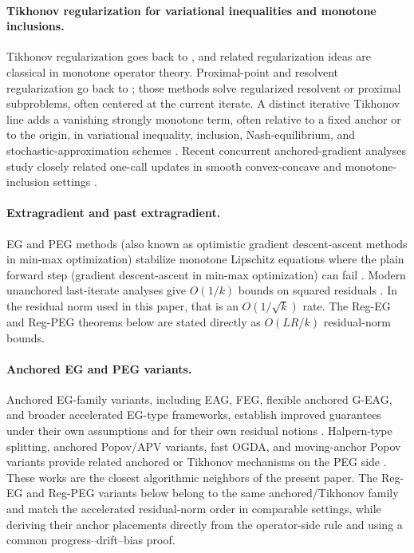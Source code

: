 \documentclass[letterpaper,11pt]{article}
\begin{document}
\paragraph{Tikhonov regularization for variational inequalities and monotone inclusions.}
Tikhonov regularization goes back to \cite{Tikhonov1943}, and related
regularization ideas are classical in monotone operator theory. Proximal-point
and resolvent regularization go back to
\cite{martinet1970regularisation,rockafellar1976monotone}; those methods solve
regularized resolvent or proximal subproblems, often centered at the current
iterate. A distinct iterative Tikhonov line adds a vanishing strongly monotone
term, often relative to a fixed anchor or to the origin, in variational
inequality, inclusion, Nash-equilibrium, and stochastic-approximation schemes
\cite{browder1966existence,xu2010regularization,kannan2012distributed,koshal2013regularized,shanbhag2013stochastic}.
Recent concurrent anchored-gradient analyses study closely related one-call updates in
smooth convex-concave and monotone-inclusion settings
\cite{surina2026improved,cai2026last}.

\paragraph{Extragradient and past extragradient.}
EG and PEG methods (also known as optimistic gradient descent-ascent
methods in min-max optimization) stabilize monotone Lipschitz equations where
the plain forward step (gradient descent-ascent in min-max optimization) can fail
\cite{korpelevich1976extragradient,popov1980modification}. Modern unanchored
last-iterate analyses give \(O(1/k)\) bounds on squared residuals
\cite{gorbunov2022extragradient,gorbunov2022last}. In the residual norm used in
this paper, that is an \(O(1/\sqrt{k})\) rate. The Reg-EG and Reg-PEG theorems
below are stated directly as \(O(LR/k)\) residual-norm bounds.

\paragraph{Anchored EG and PEG variants.}
Anchored EG-family variants, including EAG, FEG, flexible anchored G-EAG, and
broader accelerated EG-type frameworks, establish improved guarantees under
their own assumptions and for their own residual notions
\cite{yoon2021accelerated,lee2021fast,boct2024extra,tran2025accelerated}.
Halpern-type splitting, anchored Popov/APV variants, fast OGDA, and
moving-anchor Popov variants provide related anchored or Tikhonov mechanisms on
the PEG side
\cite{diakonikolas2020halpern,tran2021halpern,bot2025fast,alcala2025stochastic}.
These works are the closest algorithmic neighbors of the present paper. The
Reg-EG and Reg-PEG variants below belong to the same anchored/Tikhonov family
and match the accelerated residual-norm order in comparable settings, while
deriving their anchor placements directly from the operator-side rule and using
a common progress--drift--bias proof.
\end{document}
